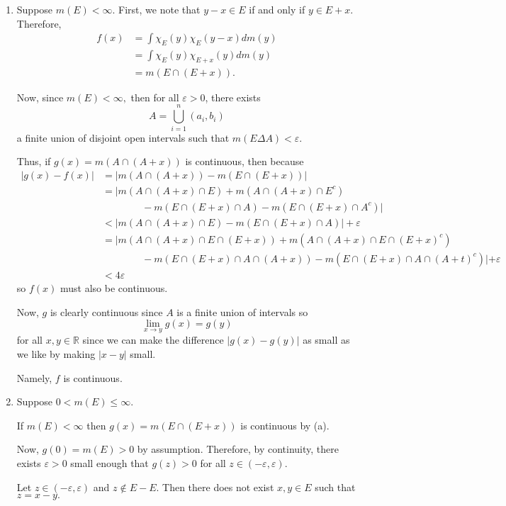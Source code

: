 \documentclass[12pt]{Homework}
\begin{document}
\begin{solution}$\,$
 \begin{enumerate}[label=(\alph*)]
    \item Suppose $m(E)<\infty$. First, we note that $y-x\in E$ if and only if $y\in E+x$. Therefore, \begin{align*}
        f(x)&=\int\chi_E(y)\chi_E(y-x)dm(y)\\
        &=\int\chi_E(y)\chi_{E+x}(y)dm(y)\\
        &=m(E\cap (E+x)).
    \end{align*}
    
    Now, since $m(E)<\infty,$ then for all $\varepsilon>0$, there exists $$A=\bigcup_{i=1}^n(a_i,b_i)$$ a finite union of disjoint open intervals such that $m(E\Delta A)<\varepsilon.$
    
    Thus, if $g(x)=m(A\cap(A+x))$ is continuous, then because \begin{align*}
        |g(x)-f(x)|&=|m(A\cap(A+x))-m(E\cap (E+x))|\\
        &=|m(A\cap(A+x)\cap E)+m(A\cap(A+x)\cap E^c)\\
        &\qquad\qquad-m(E\cap(E+x)\cap A)-m(E\cap(E+x)\cap A^c)|\\
        &<|m(A\cap(A+x)\cap E)-m(E\cap(E+x)\cap A)|+\varepsilon\\
        &=|m(A\cap(A+x)\cap E\cap(E+x))+m(A\cap(A+x)\cap E\cap(E+x)^c)\\
        &\qquad\qquad-m(E\cap(E+x)\cap A\cap(A+x))-m(E\cap(E+x)\cap A\cap(A+t)^c)|+\varepsilon\\
        &<4\varepsilon
    \end{align*} so $f(x)$ must also be continuous.
    
    Now, $g$ is clearly continuous since $A$ is a finite union of intervals so $$\lim_{x\to y}g(x)=g(y)$$ for all $x,y\in\mathbb{R}$ since we can make the difference $|g(x)-g(y)|$ as small as we like by making $|x-y|$ small.
    
    Namely, $f$ is continuous.
    \item Suppose $0<m(E)\le\infty$. 
    
    If $m(E)<\infty$ then $g(x)=m(E\cap(E+x))$ is continuous by (a).
    
    Now, $g(0)=m(E)>0$ by assumption. Therefore, by continuity, there exists $\varepsilon>0$ small enough that $g(z)>0$ for all $z\in(-\varepsilon,\varepsilon)$.
    
    Let $z\in(-\varepsilon,\varepsilon)$ and $z\notin E-E$. Then there does not exist $x,y\in E$ such that $z=x-y.$
    

\end{enumerate}
\end{solution}
\end{document}
